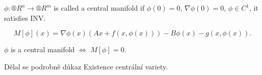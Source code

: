 \documentclass[12pt]{article}					%
\begin{document}
\begin{definice}
	$\phi: ®R^n \rightarrow ®R^m$ is called a central manifold if $\phi(0) = 0$, $\nabla \phi(0) = 0$, $\phi \in C^1$, it satisfies INV.
\end{definice}

\begin{definice}
	$$ M[\phi](x) = \nabla \phi(x) (A x + f(x, \phi(x))) - B \phi(x) - g(x, \phi(x)). $$
\end{definice}

\begin{dusledek}
	$\phi$ is a central manifold $\Leftrightarrow$ $M[\phi] = 0$.
\end{dusledek}


\begin{poznamka}
	Dělal se podrobně důkaz Existence centrální variety.
\end{poznamka}
\end{document}
